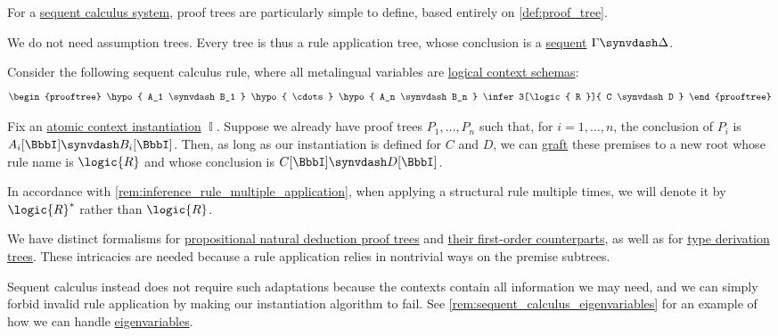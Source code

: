\begin{definition}\label{def:sequent_calculus_proof_tree}\mimprovised
  For a \hyperref[def:abstract_sequent_calculus_system]{sequent calculus system}, proof trees are particularly simple to define, based entirely on \cref{def:proof_tree}.

  We do not need assumption trees. Every tree is thus a rule application tree, whose conclusion is a \hyperref[def:sequent]{sequent} \( \Gamma \synvdash \Delta \).

  Consider the following sequent calculus rule, where all metalingual variables are \hyperref[def:logical_context_schema]{logical context schemas}:
  \begin{equation*}
    \begin{prooftree}
      \hypo{ A_1 \synvdash B_1 }
      \hypo{ \cdots }
      \hypo{ A_n \synvdash B_n }
      \infer3[\logic{ R }]{ C \synvdash D }
    \end{prooftree}
  \end{equation*}

  Fix an \hyperref[def:atomic_context_instantiation]{atomic context instantiation} \( \BbbI \). Suppose we already have proof trees \( P_1, \ldots, P_n \) such that, for \( i = 1, \ldots, n \), the conclusion of \( P_i \) is \( A_i[\BbbI] \synvdash B_i[\BbbI] \). Then, as long as our instantiation is defined for \( C \) and \( D \), we can \hyperref[def:ordered_tree_grafting_product]{graft} these premises to a new root whose rule name is \( \logic{R} \) and whose conclusion is \( C[\BbbI] \synvdash D[\BbbI] \).
\end{definition}
\begin{comments}
  \item In accordance with \cref{rem:inference_rule_multiple_application}, when applying a structural rule multiple times, we will denote it by \( \logic{R}^* \) rather than \( \logic{R} \).

  \item We have distinct formalisms for \hyperref[def:propositional_natural_deduction_proof_tree]{propositional natural deduction proof trees} and \hyperref[def:fol_natural_deduction_proof_tree]{their first-order counterparts}, as well as for \hyperref[def:type_derivation_tree]{type derivation trees}. These intricacies are needed because a rule application relies in nontrivial ways on the premise subtrees.

  Sequent calculus instead does not require such adaptations because the contexts contain all information we may need, and we can simply forbid invalid rule application by making our instantiation algorithm to fail. See \cref{rem:sequent_calculus_eigenvariables} for an example of how we can handle \hyperref[def:fol_natural_deduction_proof_tree/eigenvariables]{eigenvariables}.
\end{comments}

